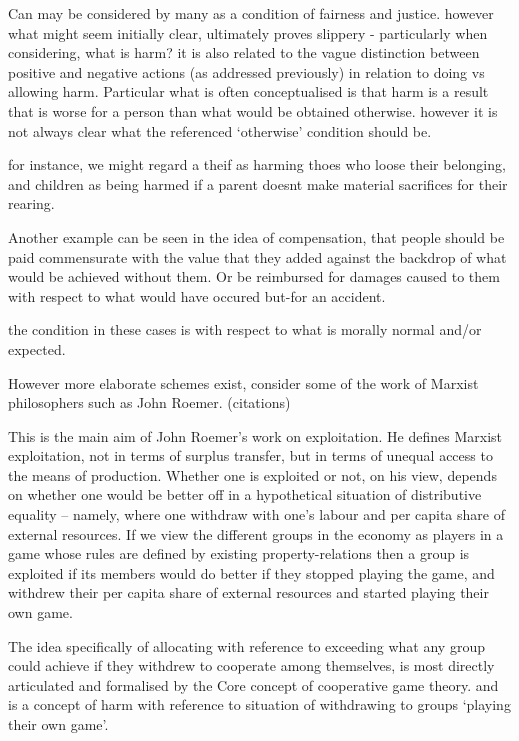 Can may be considered by many as a condition of fairness and justice.
however what might seem initially clear, ultimately proves slippery - particularly when considering, what is harm?
it is also related to the vague distinction between positive and negative actions (as addressed previously) in relation to doing vs allowing harm.
Particular what is often conceptualised is that harm is a result that is worse for a person than what would be obtained otherwise.
however it is not always clear what the referenced `otherwise' condition should be.

for instance, we might regard a theif as harming thoes who loose their belonging, and children as being harmed if a parent doesnt make material sacrifices for their rearing.

Another example can be seen in the idea of compensation, that people should be paid commensurate with the value that they added against the backdrop of what would be achieved without them.
Or be reimbursed for damages caused to them with respect to what would have occured but-for an accident.

the condition in these cases is with respect to what is morally normal and/or expected.

However more elaborate schemes exist, consider some of the work of Marxist philosophers such as John Roemer. (citations)

\begin{displayquote}
This is the main aim of John Roemer's work on exploitation. He defines Marxist exploitation, not in terms of surplus transfer, but in terms of unequal access to the means of production. Whether one is exploited or not, on his view, depends on whether one would be better off in a hypothetical situation of distributive equality -- namely, where one withdraw with one's labour and per capita share of external resources. If we view the different groups in the economy as players in a game whose rules are defined by existing property-relations then a group is exploited if its members would do better if they stopped playing the game, and withdrew their per capita share of external resources and started playing their own game.\cite{kymlicka2002contemporary}
\end{displayquote}

The idea specifically of allocating with reference to exceeding what any group could achieve if they withdrew to cooperate among themselves, is most directly articulated and formalised by the Core concept of cooperative game theory.
and is a concept of harm with reference to situation of withdrawing to groups `playing their own game'.

